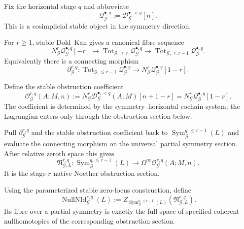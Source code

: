 Fix the horizontal stage $q$ and abbreviate
\[
\mathcal Q_{\mathcal G}^{\bullet,q}
:=
\mathcal D_{\mathcal G}^{\bullet,<q}[n].
\]
This is a cosimplicial stable object in the symmetry direction.

For $r\ge1$, stable Dold--Kan gives a canonical fibre sequence
\[
N_{\mathcal G}^r
\mathcal Q_{\mathcal G}^{\bullet,q}[-r]
\longrightarrow
\operatorname{Tot}_{\mathcal G,\le r}
\mathcal Q_{\mathcal G}^{\bullet,q}
\longrightarrow
\operatorname{Tot}_{\mathcal G,\le r-1}
\mathcal Q_{\mathcal G}^{\bullet,q}.
\]
Equivalently there is a connecting morphism
\[
\partial_{\mathcal G}^{r,q}:
\operatorname{Tot}_{\mathcal G,\le r-1}
\mathcal Q_{\mathcal G}^{\bullet,q}
\longrightarrow
N_{\mathcal G}^r
\mathcal Q_{\mathcal G}^{\bullet,q}[1-r].
\]

\begin{definition}
\label{def:symmetry-noether-native-stage-r-noether-obstruction-coefficient}
Define the stable obstruction coefficient
\[
\boxed{
\mathcal O_{\mathcal G}^{r,q}(A;M,n)
:=
N_{\mathcal G}^r
\mathcal D_{\mathcal G}^{\bullet,<q}(A;M)[n+1-r]
=
N_{\mathcal G}^r
\mathcal Q_{\mathcal G}^{\bullet,q}[1-r].
}
\]
The coefficient is determined by the symmetry--horizontal cochain system; the
Lagrangian enters only through the obstruction section below.
\end{definition}

\begin{construction}
\label{constr:symmetry-noether-universal-stage-r-noether-obstruction-section}
Pull $\partial_{\mathcal G}^{r,q}$ and the stable obstruction coefficient back to
$\operatorname{Sym}_{\mathcal G}^{q,\le r-1}(L)$ and evaluate the connecting
morphism on the universal partial symmetry section.  After relative zeroth space this gives
\[
\boxed{
\mathfrak N_{\mathcal G,L}^{r,q}:
\operatorname{Sym}_{\mathcal G}^{q,\le r-1}(L)
\longrightarrow
\Omega^\infty
\mathcal O_{\mathcal G}^{r,q}(A;M,n).
}
\]
It is the stage-$r$ native Noether obstruction section.
\end{construction}

\begin{definition}
\label{def:symmetry-noether-noether-nullhomotopy-object}
Using the parameterized stable zero-locus construction, define
\[
\boxed{
\operatorname{NullNId}_{\mathcal G}^{r,q}(L)
:=
Z_{\operatorname{Sym}_{\mathcal G}^{q,\le r-1}(L)}
\left(\mathfrak N_{\mathcal G,L}^{r,q}\right).
}
\]
Its fibre over a partial symmetry is exactly the full space of specified coherent
nullhomotopies of the corresponding obstruction section.
\end{definition}

